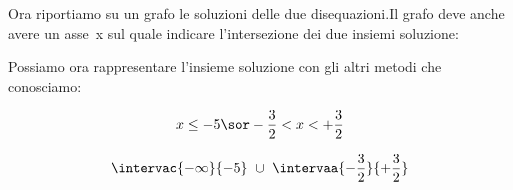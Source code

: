 \begin{esempio}
Ora riportiamo su un grafo le soluzioni delle due disequazioni.Il grafo deve 
anche avere un asse~x sul quale indicare l'intersezione dei due insiemi 
soluzione:
\begin{center} \sistemaa \end{center}
% 
% 
% 
% 
% 

Possiamo ora rappresentare l'insieme soluzione con gli altri metodi che 
conosciamo:

\begin{minipage}{.49 \linewidth}
\[x \le -5 \sor -\dfrac{3}{2} < x < +\dfrac{3}{2}\]
\end{minipage}
\hfill
\begin{minipage}{.49 \linewidth}
\[\intervac{-\infty}{-5}~\cup~\intervaa{-\dfrac{3}{2}}{+\dfrac{3}{2}}\]
\end{minipage}
\end{esempio}

\newpage %

